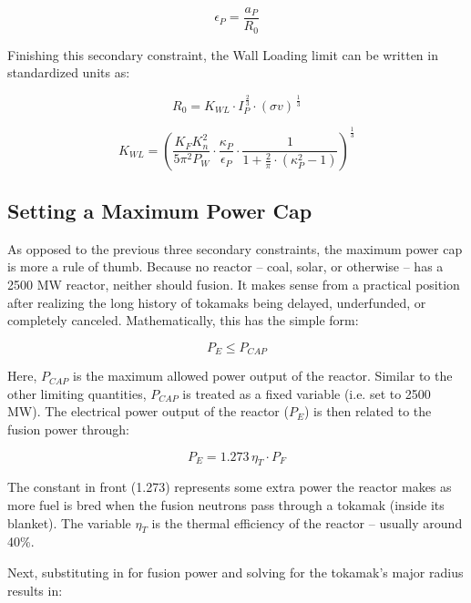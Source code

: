 \begin{equation}
	\epsilon_P = \frac{a_P}{R_0}
\end{equation}

Finishing this secondary constraint, the Wall Loading limit can be written in standardized units as:

\begin{equation}
	R_0 = K_{WL} \cdot I_P^{ \, \frac{2}{3} } \cdot (\sigma v) ^{ \, \frac{1}{3} }
\end{equation}

\begin{equation}
	K_{WL} = \left( \frac{ K_F K_n^2 }{ 5 \pi^2 P_W } \cdot \frac{\kappa_P}{\epsilon_P} \cdot \frac{1}{1 + \frac{2}{\pi} \cdot ( \kappa_P^2 - 1 ) } \right) ^ { \frac{1}{3} }
\end{equation}

\subsection{Setting a Maximum Power Cap}

As opposed to the previous three secondary constraints, the maximum power cap is more a rule of thumb. Because no reactor -- coal, solar, or otherwise -- has a 2500 MW reactor, neither should fusion. It makes sense from a practical position after realizing the long history of tokamaks being delayed, underfunded, or completely canceled. Mathematically, this has the simple form:

\begin{equation}
	P_E \le P_{CAP}
\end{equation}

Here, $P_{CAP}$ is the maximum allowed power output of the reactor. Similar to the other limiting quantities, $P_{CAP}$ is treated as a fixed variable (i.e. set to 2500 MW). The electrical power output of the reactor ($P_E$) is then related to the fusion power through:

\begin{equation}
	P_E = 1.273 \, \eta_T \cdot P_F
\end{equation}

The constant in front (1.273) represents some extra power the reactor makes as more fuel is bred when the fusion neutrons pass through a tokamak (inside its blanket). The variable $\eta_T$ is the thermal efficiency of the reactor -- usually around 40\%.

Next, substituting in for fusion power and solving for the tokamak's major radius results in:

